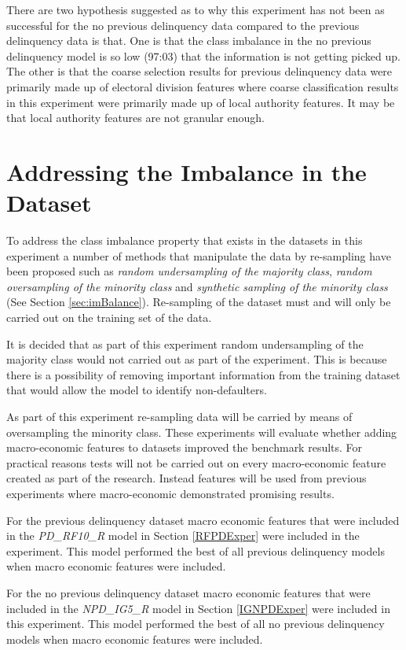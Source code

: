There are two hypothesis suggested as to why this experiment has not been as successful for the no previous delinquency data compared to the previous delinquency data is that. One is that the class imbalance in the no previous delinquency model is so low (97:03) that the information is not getting picked up. The other is that the coarse selection results for previous delinquency data were primarily made up of electoral division features where coarse classification results in this experiment were primarily made up of local authority features. It may be that local authority features are not granular enough. 

\section{Addressing the Imbalance in the Dataset}
To address the class imbalance property that exists in the datasets in this experiment a number of methods that manipulate the data by re-sampling have been proposed such as \textit{random undersampling of the majority class}, \textit{random oversampling of the minority class} and \textit{synthetic sampling of the minority class} (See Section \ref{sec:imBalance}). Re-sampling of the dataset must and will only be carried out on the training set of the data.

It is decided that as part of this experiment random undersampling of the majority class would not carried out as part of the experiment. This is because there is a possibility of removing important information from the training dataset that would allow the model to identify non-defaulters.

As part of this experiment re-sampling data will be carried by means of oversampling the minority class. These experiments will evaluate whether adding macro-economic features to datasets improved the benchmark results. For practical reasons tests will not be carried out on every macro-economic feature created as part of the research. Instead features will be used from previous experiments where macro-economic demonstrated promising results. 

For the previous delinquency dataset macro economic features that were included in the \textit{PD\_RF10\_R} model in Section \ref{RFPDExper} were included in the experiment. This model performed the best of all previous delinquency models when macro economic features were included.

For the no previous delinquency dataset macro economic features that were included in the \textit{NPD\_IG5\_R} model in Section \ref{IGNPDExper} were included in this experiment. This model performed the best of all no previous delinquency models when macro economic features were included. 

